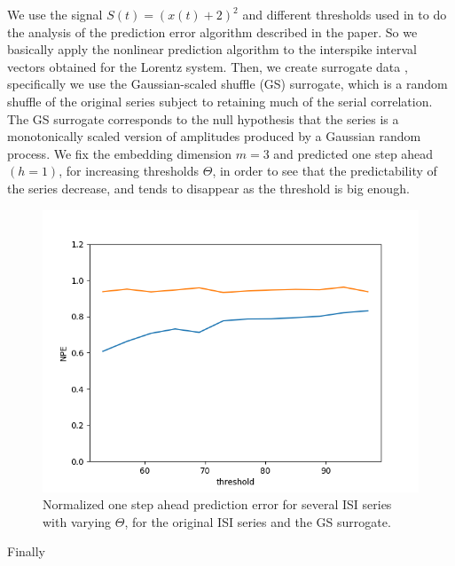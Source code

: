 \documentclass[10pt]{article}
\begin{document}
We use the signal $S(t)=(x(t)+2)^2$ and different thresholds used in \cite{interspike} to do the analysis of the prediction error algorithm described in the paper. So we basically apply the nonlinear prediction algorithm to the interspike interval vectors obtained for the Lorentz system. Then, we create surrogate data \cite{surrogate}, specifically we use the Gaussian-scaled shuffle (GS) surrogate, which is a random shuffle of the original series subject to retaining much of the serial correlation. The GS surrogate corresponds to the null hypothesis that the series is a monotonically scaled version of amplitudes produced by a Gaussian random process. We fix the embedding dimension $m=3$ and predicted one step ahead $(h=1)$, for increasing thresholds $\Theta$, in order to see that the predictability of the series decrease, and tends to disappear as the threshold is big enough.

\begin{figure}[h!]
\centering
\includegraphics[scale=0.5]{NPE_12series}
\caption{Normalized one step ahead prediction error for several ISI series with varying $\Theta$, for the original ISI series and the GS surrogate.}
\label{fig:12series}
\end{figure}

Finally 
\end{document}

